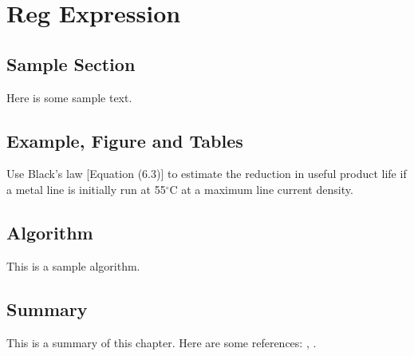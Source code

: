 \documentclass{wileySix}
\begin{document}
\chapter{Reg Expression}

\section{Sample Section}
Here is some sample text.

\section{Example, Figure and Tables}
\vskip6pt
\begin{example}
	Use Black's law [Equation (6.3)] to estimate the reduction in useful product
	life if a metal line is initially run at 55$^\circ$C at a maximum line
	current density.
\end{example}

\section{Algorithm}
This is a sample algorithm.

\section{Summary}
This is a summary of this chapter.
Here are some references: \cite{xkilby}, \cite{xberen}.
\end{document}
